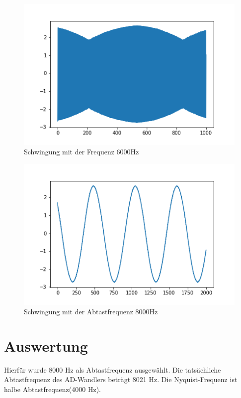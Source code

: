 \documentclass[12pt, oneside, a4paper, \docLanguage]{report}
\begin{document}
\begin{figure}[H]
	\centering\small
	\includegraphics[width=12cm]{6000.png}
	\caption{Schwingung mit der Frequenz 6000Hz}
\end{figure}


\begin{figure}[H]
	\centering\small
	\includegraphics[width=12cm]{8000.png}
	\caption{Schwingung mit der Abtastfrequenz 8000Hz}
\end{figure}



\section{Auswertung}

\label{chap:VERSUCH_5_AUSWERTUNG}

\qquad Hierfür wurde 8000 Hz als Abtastfrequenz ausgewählt. Die tatsächliche Abtastfrequenz des AD-Wandlers beträgt 8021 Hz. Die Nyquist-Frequenz ist halbe Abtastfrequenz(4000 Hz).
\end{document}
